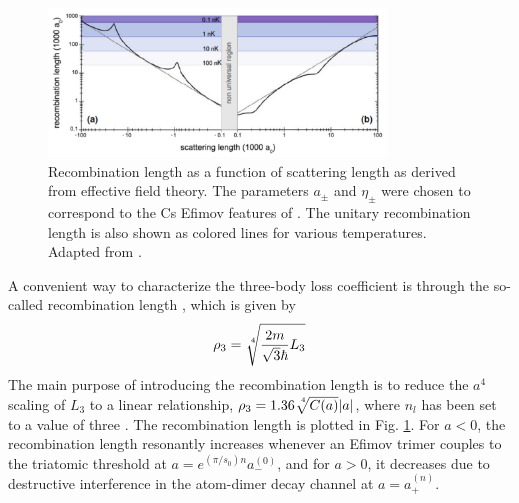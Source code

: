 \documentclass[prl,onecolumn,amsmath,amssymb,titlepage,nofootinbib,preprint]{revtex4-1}
\begin{document}
	
		\begin{figure}
			\includegraphics[width=0.8\textwidth]{Figures/recombination_length}
			\caption{Recombination length as a function of scattering length as derived from effective field theory. The parameters $a_{\pm}$ and $\eta_{\pm}$ were chosen to correspond to the Cs Efimov features of \cite{Kraemer2006_1st_observ}. The unitary recombination length is also shown as colored lines for various temperatures. Adapted from \cite{Ferlaino2011}.}
			\label{fig:recombination_length}
		\end{figure}
A convenient way to characterize the three-body loss coefficient is through the so-called recombination length 
\cite{Ferlaino2011}, which is given by
	\begin{equation}\label{eq:recombination_length_defined}
		\rho_{3}=\sqrt[\leftroot{-2}\uproot{2}4]{\frac{2m}{\sqrt{3}\hbar}L_{3}}
	\end{equation}
The main purpose of introducing the recombination length is to reduce the $a^{4}$ scaling of $L_{3}$ to a linear relationship, $\rho_{3}=1.36\sqrt[\leftroot{-3}\uproot{3}4]{C(a)}|a|$, where $n_{l}$ has been set to a value of three \cite{Ferlaino2011}\cite{Esry1999}.  The recombination length is plotted in Fig. \ref{fig:recombination_length}.  For $a<0$, the recombination length resonantly increases whenever an Efimov trimer couples to the triatomic threshold at $a=e^{(\pi/s_{0})n}a_{-}^{(0)}$, and for $a>0$, it decreases due to destructive interference in the atom-dimer decay channel at $a=a_{+}^{(n)}$. 
\end{document}
